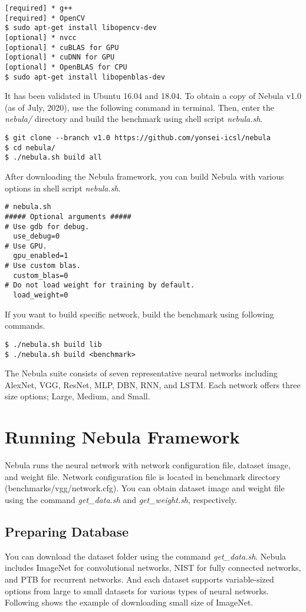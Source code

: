 \documentclass[10pt]{article}
\begin{document}
\begin{Verbatim}[frame=single,fontsize=\small]
[required] * g++
[required] * OpenCV
$ sudo apt-get install libopencv-dev
[optional] * nvcc
[optional] * cuBLAS for GPU 
[optional] * cuDNN for GPU
[optional] * OpenBLAS for CPU
$ sudo apt-get install libopenblas-dev
\end{Verbatim}

It has been validated in Ubuntu 16.04 and 18.04.
To obtain a copy of Nebula v1.0 (as of July, 2020), use the following command in terminal.
Then, enter the \emph{nebula/} directory and build the benchmark using shell script \emph{nebula.sh}.

\begin{Verbatim}[frame=single,fontsize=\small]
$ git clone --branch v1.0 https://github.com/yonsei-icsl/nebula
$ cd nebula/
$ ./nebula.sh build all
\end{Verbatim}

After downloading the Nebula framework, you can build Nebula with various options in shell script \emph{nebula.sh}.

\begin{Verbatim}[frame=single,fontsize=\small]
# nebula.sh
##### Optional arguments #####
# Use gdb for debug.
  use_debug=0
# Use GPU.
  gpu_enabled=1
# Use custom blas.
  custom_blas=0
# Do not load weight for training by default.
  load_weight=0
\end{Verbatim}
If you want to build specific network, build the benchmark using following commands.
\begin{Verbatim}[frame=single,fontsize=\small]
$ ./nebula.sh build lib
$ ./nebula.sh build <benchmark>
\end{Verbatim}
The Nebula suite consists of seven representative neural networks including AlexNet, VGG, ResNet, MLP, DBN, RNN, and LSTM.
Each network offers three size options; Large, Medium, and Small.

\section{Running Nebula Framework} \label{sec:running}

Nebula runs the neural network with network configuration file, dataset image, and weight file.
Network configuration file is located in benchmark directory (benchmarks/vgg/network.cfg).
You can obtain dataset image and weight file using the command \emph{get\_data.sh} and \emph{get\_weight.sh}, respectively.

\subsection{Preparing Database} \label{subsec:database}
You can download the dataset folder using the command \emph{get\_data.sh}.
Nebula includes ImageNet for convolutional networks, NIST for fully connected networks, and PTB for recurrent networks.
And each dataset supports variable-sized options from large to small datasets for various types of neural networks. 
Following shows the example of downloading small size of ImageNet.
\end{document}
